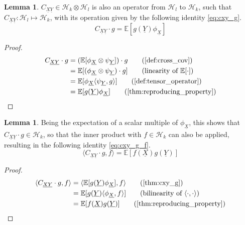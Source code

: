 \documentclass[twoside]{article} \usepackage{aistats2017}
\theoremstyle{definition}
\newtheorem{lemma}[theorem]{Lemma}
\newcommand{\rv}[1]{\underline{#1}}
\newcommand{\expect}[1]{{\mathbb{E}[#1]}}
\newcommand{\inner}[2]{{\langle #1, #2 \rangle}}
\newcommand{\Hk}{\mathcal{H}_{k}}
\newcommand{\Hl}{\mathcal{H}_{l}}
\newcommand{\phiX}{\phi_{\rv{X}}}
\newcommand{\psiY}{\psi_{\rv{Y}}}
\newcommand{\Cxy}{C_{\rv{X} \rv{Y}}}
\begin{document}
	\begin{lemma} \label{thm:cxy_g}
		$\Cxy \in \mathcal{H}_{k} \otimes \mathcal{H}_{l}$ is also an operator from $\Hl$ to $\Hk$, such that $\Cxy : \Hl \mapsto \Hk$, with its operation given by the following identity \eqref{eq:cxy_g}.
		\begin{equation}
			\Cxy \cdot g = \expect{g(\rv{Y}) \phiX}
		\label{eq:cxy_g}
		\end{equation}
	
		\begin{proof}
		\begin{align*}
			\Cxy \cdot g &=  (\expect{\phiX \otimes \psiY}) \cdot g \tag{\cref{def:cross_cov}} \\
			&= \expect{(\phiX \otimes \psiY) \cdot g} \tag{linearity of $\expect{\cdot}$} \\
			&= \expect{\phiX \inner{\psiY}{g}} \tag{\cref{def:tensor_operator}} \\
			&= \expect{g(\rv{Y}) \phiX} \tag{\cref{thm:reproducing_property}}
		\end{align*}
		\end{proof}
	\end{lemma}
		
	\begin{lemma} \label{thm:cxy_g_f}
		Being the expectation of a scalar multiple of $\phiX$, this shows that $\Cxy \cdot g \in \mathcal{H}_{k}$, so that the inner product with $f \in \mathcal{H}_{k}$ can also be applied, resulting in the following identity \eqref{eq:cxy_g_f}.
		\begin{equation}
			\inner{\Cxy \cdot g}{f} = \expect{f(\rv{X}) g(\rv{Y})}
		\label{eq:cxy_g_f}
		\end{equation}
		\begin{proof}
		\begin{align*}
			\inner{\Cxy \cdot g}{f} &= \inner{\expect{g(\rv{Y}) \phiX}}{f} \tag{\cref{thm:cxy_g}}\\
			&= \expect{g(\rv{Y}) \inner{\phiX}{f}} \tag{bilinearity of $\inner{\cdot}{\cdot}$} \\
			&= \expect{f(\rv{X}) g(\rv{Y})} \tag{\cref{thm:reproducing_property}}
		\end{align*}
		\end{proof}
	\end{lemma}
		
\end{document}
